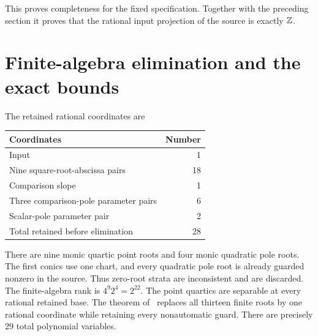 \documentclass[11pt,a4paper]{article}
\begin{document}
This proves completeness for the fixed specification. Together with
the preceding section it proves that the rational input projection
of the source is exactly $\mathbb Z$.

\section{Finite-algebra elimination and the exact bounds}

The retained rational coordinates are
\begin{center}
\begin{tabular}{lr}
\toprule
Coordinates & Number\\
\midrule
Input & 1\\
Nine square-root-abscissa pairs & 18\\
Comparison slope & 1\\
Three comparison-pole parameter pairs & 6\\
Scalar-pole parameter pair & 2\\
\midrule
Total retained before elimination & 28\\
\bottomrule
\end{tabular}
\end{center}
There are nine monic quartic point roots and four monic
quadratic pole roots. The first conics use one chart, and every
quadratic pole root is already guarded nonzero in the source.
Thus zero-root strata are inconsistent and are discarded.
The finite-algebra rank is $4^9 2^4=2^{22}$.
The point quartics are separable at every rational retained base.
The theorem of~\cite{Active} replaces all thirteen finite roots
by one rational coordinate while retaining every nonautomatic guard.
There are precisely 29 total polynomial variables.
\end{document}
